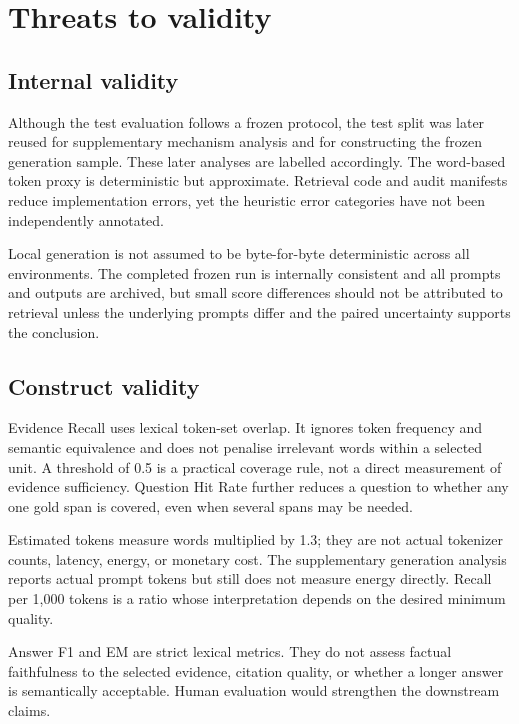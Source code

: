 \section{Threats to validity}

\subsection{Internal validity}

Although the test evaluation follows a frozen protocol, the test split was later reused for supplementary mechanism analysis and for constructing the frozen generation sample. These later analyses are labelled accordingly. The word-based token proxy is deterministic but approximate. Retrieval code and audit manifests reduce implementation errors, yet the heuristic error categories have not been independently annotated.

Local generation is not assumed to be byte-for-byte deterministic across all environments. The completed frozen run is internally consistent and all prompts and outputs are archived, but small score differences should not be attributed to retrieval unless the underlying prompts differ and the paired uncertainty supports the conclusion.

\subsection{Construct validity}

Evidence Recall uses lexical token-set overlap. It ignores token frequency and semantic equivalence and does not penalise irrelevant words within a selected unit. A threshold of 0.5 is a practical coverage rule, not a direct measurement of evidence sufficiency. Question Hit Rate further reduces a question to whether any one gold span is covered, even when several spans may be needed.

Estimated tokens measure words multiplied by 1.3; they are not actual tokenizer counts, latency, energy, or monetary cost. The supplementary generation analysis reports actual prompt tokens but still does not measure energy directly. Recall per 1,000 tokens is a ratio whose interpretation depends on the desired minimum quality.

Answer F1 and EM are strict lexical metrics. They do not assess factual faithfulness to the selected evidence, citation quality, or whether a longer answer is semantically acceptable. Human evaluation would strengthen the downstream claims.

